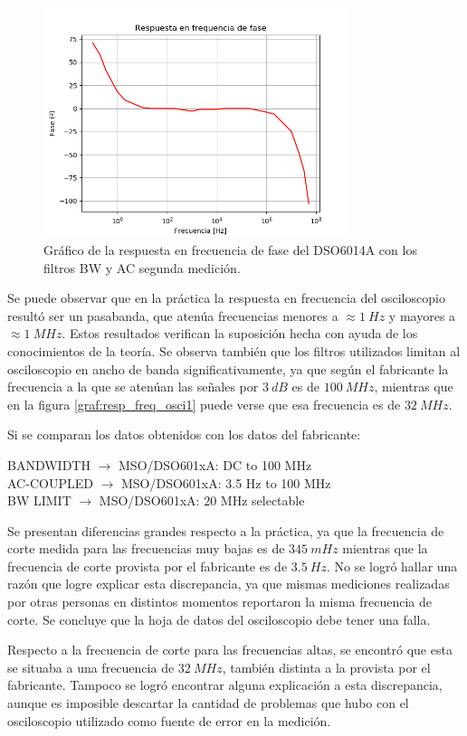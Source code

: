 \documentclass[11pt, a4paper]{article}
\begin{document}
\begin{figure}[H]
	\centering
	\includegraphics[width=0.8\textwidth]{resp_freq_osci2.png}
	\caption{Gráfico de la respuesta en frecuencia de fase del DSO6014A con los filtros BW y AC segunda medición.} 
	\label{graf:resp_freq_osci2}
\end{figure}

Se puede observar que en la práctica la respuesta en frecuencia del osciloscopio resultó ser un pasabanda, que atenúa frecuencias menores a $\approx 1 \ Hz$ y mayores a $\approx 1 \ MHz$. Estos resultados verifican la suposición hecha con ayuda de los conocimientos de la teoría. Se observa también que los filtros utilizados limitan al osciloscopio en ancho de banda significativamente, ya que según el fabricante la frecuencia a la que se atenúan las señales por $3 \ dB$ es de $100 \ MHz$, mientras que en la figura \ref{graf:resp_freq_osci1} puede verse que esa frecuencia es de $32 \ MHz$.

Si se comparan los datos obtenidos con los datos del fabricante:
\begin{center}
BANDWIDTH $\rightarrow$ MSO/DSO601xA: DC to 100 MHz\\
AC-COUPLED $\rightarrow$ MSO/DSO601xA: 3.5 Hz to 100 MHz\\
BW LIMIT $\rightarrow$ MSO/DSO601xA: 20 MHz selectable\\
\end{center}

Se presentan diferencias grandes respecto a la práctica, ya que la frecuencia de corte medida para las frecuencias muy bajas es de $345 \ mHz$ mientras que la frecuencia de corte provista por el fabricante es de $3.5 \ Hz$. No se logró hallar una razón que logre explicar esta discrepancia, ya que mismas mediciones realizadas por otras personas en distintos momentos reportaron la misma frecuencia de corte. Se concluye que la hoja de datos del osciloscopio debe tener una falla.

Respecto a la frecuencia de corte para las frecuencias altas, se encontró que esta se situaba a una frecuencia de $32 \ MHz$, también distinta a la provista por el fabricante. Tampoco se logró encontrar alguna explicación a esta discrepancia, aunque es imposible descartar la cantidad de problemas que hubo con el osciloscopio utilizado como fuente de error en la medición.
\end{document}
